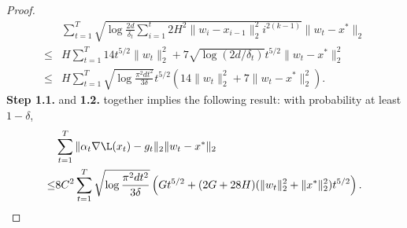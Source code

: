 \begin{proof}
\begin{align*}
    &\sum_{t=1}^T\sqrt{\log\frac{2d}{\delta_t}\sum_{i=1}^t2H^2\|w_i-x_{i-1}\|_2^2i^{2(k-1)}}\|w_t-x^*\|_2 \\
    \leq & H\sum_{t=1}^T 14t^{5/2}\|w_t\|_2^2 + 7\sqrt{\log(2d/\delta_t)}t^{5/2}\|w_t-x^*\|_2^2 \\
    \leq & H\sum_{t=1}^T \sqrt{\log \frac{\pi^2dt^2}{3\delta}}t^{5/2}(14\|w_t\|_2^2+7\|w_t-x^*\|_2^2).
\end{align*}
\textbf{Step 1.1.} and \textbf{1.2.} together implies the following result: with probability at least $1-\delta$,
\begin{align*}
    &\sum_{t=1}^T\|\alpha_t\nabla\L(x_t)-g_t\|_2\|w_t-x^*\|_2 \\
    \leq & 8C^2\sum_{t=1}^T \sqrt{\log\frac{\pi^2dt^2}{3\delta}}\left( Gt^{5/2} + (2G+28H)(\|w_t\|_2^2+\|x^*\|_2^2)t^{5/2} \right).
\end{align*}


\end{proof}

